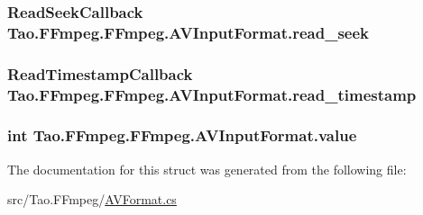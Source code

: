 \label{struct_tao_1_1_f_fmpeg_1_1_f_fmpeg_1_1_a_v_input_format_a99514f9c69037d03722066532b4357bd}
\hypertarget{struct_tao_1_1_f_fmpeg_1_1_f_fmpeg_1_1_a_v_input_format_a32acdddea242216b60d3887ad2755436}{
\subsubsection[{read\_\-seek}]{\setlength{\rightskip}{0pt plus 5cm}ReadSeekCallback {\bf Tao.FFmpeg.FFmpeg.AVInputFormat.read\_\-seek}}}
\label{struct_tao_1_1_f_fmpeg_1_1_f_fmpeg_1_1_a_v_input_format_a32acdddea242216b60d3887ad2755436}
\hypertarget{struct_tao_1_1_f_fmpeg_1_1_f_fmpeg_1_1_a_v_input_format_a145fa32658fb7753384e7e4004ded490}{
\subsubsection[{read\_\-timestamp}]{\setlength{\rightskip}{0pt plus 5cm}ReadTimestampCallback {\bf Tao.FFmpeg.FFmpeg.AVInputFormat.read\_\-timestamp}}}
\label{struct_tao_1_1_f_fmpeg_1_1_f_fmpeg_1_1_a_v_input_format_a145fa32658fb7753384e7e4004ded490}
\hypertarget{struct_tao_1_1_f_fmpeg_1_1_f_fmpeg_1_1_a_v_input_format_a84d8cc5b45e34e17f4bba6953e55fa26}{
\subsubsection[{value}]{\setlength{\rightskip}{0pt plus 5cm}int {\bf Tao.FFmpeg.FFmpeg.AVInputFormat.value}}}
\label{struct_tao_1_1_f_fmpeg_1_1_f_fmpeg_1_1_a_v_input_format_a84d8cc5b45e34e17f4bba6953e55fa26}


The documentation for this struct was generated from the following file:\begin{DoxyCompactItemize}
\item 
src/Tao.FFmpeg/\hyperlink{_a_v_format_8cs}{AVFormat.cs}\end{DoxyCompactItemize}
